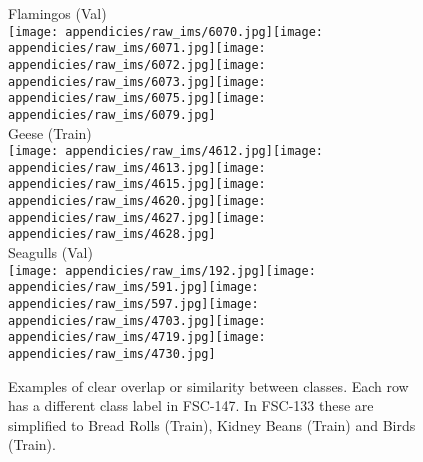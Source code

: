 \documentclass[letterpaper, 11pt]{IEEEtran}
\begin{document}
\begin{figure*}[!ht]
 Flamingos (Val)\\  \vspace{0.2em}
\texttt{[image: appendicies/raw\_ims/6070.jpg]}\texttt{[image: appendicies/raw\_ims/6071.jpg]}\texttt{[image: appendicies/raw\_ims/6072.jpg]}\texttt{[image: appendicies/raw\_ims/6073.jpg]}\texttt{[image: appendicies/raw\_ims/6075.jpg]}\texttt{[image: appendicies/raw\_ims/6079.jpg]}\\  \vspace{0.2em}
 Geese (Train)\\  \vspace{0.2em}
\texttt{[image: appendicies/raw\_ims/4612.jpg]}\texttt{[image: appendicies/raw\_ims/4613.jpg]}\texttt{[image: appendicies/raw\_ims/4615.jpg]}\texttt{[image: appendicies/raw\_ims/4620.jpg]}\texttt{[image: appendicies/raw\_ims/4627.jpg]}\texttt{[image: appendicies/raw\_ims/4628.jpg]}\\  \vspace{0.2em}
 Seagulls (Val)\\  \vspace{0.2em}
\texttt{[image: appendicies/raw\_ims/192.jpg]}\texttt{[image: appendicies/raw\_ims/591.jpg]}\texttt{[image: appendicies/raw\_ims/597.jpg]}\texttt{[image: appendicies/raw\_ims/4703.jpg]}\texttt{[image: appendicies/raw\_ims/4719.jpg]}\texttt{[image: appendicies/raw\_ims/4730.jpg]}\\     \caption{Examples of clear overlap or similarity between classes. Each row has a different class label in FSC-147. In FSC-133 these are simplified to Bread Rolls (Train), Kidney Beans (Train) and Birds (Train).}
    \label{arethesame}
\end{figure*}


\clearpage
\end{document}

